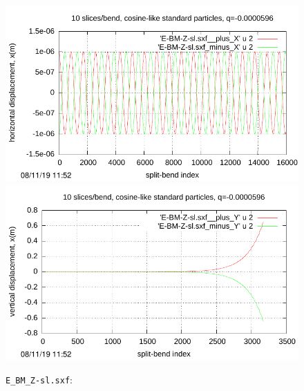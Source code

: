 \documentclass[12pt]{article}
\begin{document}
\begin{figure}[htbp] 
  \includegraphics[scale=1.0]{pdf/Fig_I-3-sl-t.pdf} 
  \includegraphics[scale=1.0]{pdf/Fig_I-3-sl-b.pdf} 
\caption{\label{fig:unchanged-q-value}
{\tt E\_BM\_Z-sl.sxf}: }
\end{figure}

\clearpage
\end{document}
